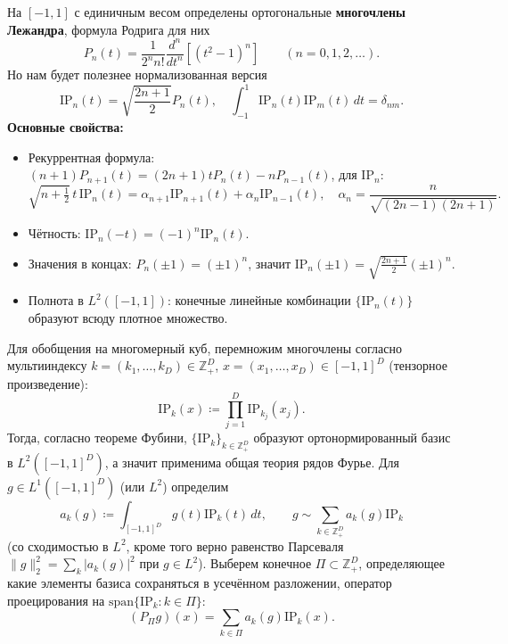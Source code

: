 \documentclass[12pt]{article}
\begin{document}
На \([-1, 1]\) с единичным весом определены ортогональные \textbf{многочлены Лежандра}, формула Родрига для них
\[P_n(t) = \frac{1}{2^n n!} \frac{d^n}{dt^n} \left[(t^2 - 1)^n\right] \qquad (n = 0,1,2,\dots).\]
Но нам будет полезнее нормализованная версия
\[\mathrm{IP}_n(t) = \sqrt{\frac{2n+1}{2}} P_n(t), \quad \int_{-1}^1 \mathrm{IP}_n(t) \mathrm{IP}_m(t) \, dt = \delta_{nm}.\]
\textbf{Основные свойства:}
\begin{itemize}
  \item Рекуррентная формула: \((n+1)P_{n+1}(t) = (2n+1)t P_n(t) - n P_{n-1}(t)\), для \(\mathrm{IP}_n\):
        \[\sqrt{n + \tfrac{1}{2}} \, t \, \mathrm{IP}_n(t) = \alpha_{n+1} \mathrm{IP}_{n+1}(t) + \alpha_n \mathrm{IP}_{n-1}(t), \quad \alpha_n = \frac{n}{\sqrt{(2n-1)(2n+1)}}.\]
  \item Чётность: \(\mathrm{IP}_n(-t) = (-1)^n \mathrm{IP}_n(t)\).
  \item Значения в концах: \(P_n(\pm 1) = (\pm 1)^n\), значит \(\mathrm{IP}_n(\pm 1) = \sqrt{\frac{2n+1}{2}} (\pm 1)^n\).
  \item Полнота в \(L^2([-1,1])\): конечные линейные комбинации \(\{\mathrm{IP}_n(t)\}\) образуют всюду плотное множество.
\end{itemize}
Для обобщения на многомерный куб, перемножим многочлены согласно мультииндексу \(k = (k_1,\dots,k_D) \in \mathbb{Z}_+^D\), \(x = (x_1,\dots,x_D) \in [-1,1]^D\) (тензорное произведение):
\[\mathrm{IP}_k(x) \coloneq \prod_{j=1}^D \mathrm{IP}_{k_j}(x_j).\]
Тогда, согласно теореме Фубини, \(\{\mathrm{IP}_k\}_{k \in \mathbb{Z}_+^D}\) образуют ортонормированный базис в \(L^2([-1,1]^D)\), а значит применима общая теория рядов Фурье.
Для \(g \in L^1([-1,1]^D)\) (или \(L^2\)) определим
\[a_k(g) \coloneq \int_{[-1,1]^D} g(t) \mathrm{IP}_k(t) \, dt, \qquad g \sim \sum_{k \in \mathbb{Z}_+^D} a_k(g) \mathrm{IP}_k\]
(со сходимостью в \(L^2\), кроме того верно равенство Парсеваля \(\|g\|_2^2 = \sum_k |a_k(g)|^2\) при \(g \in L^2\)).
Выберем конечное \(\Pi \subset \mathbb{Z}_+^D\), определяющее какие элементы базиса сохраняться в усечённом разложении, оператор проецирования на \(\mathrm{span}\{\mathrm{IP}_k : k \in \Pi\}\):
\[(P_\Pi g)(x) = \sum_{k \in \Pi} a_k(g) \mathrm{IP}_k(x).\]
\end{document}
